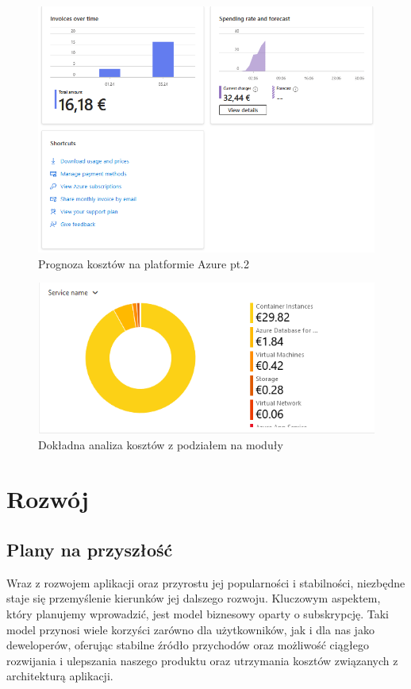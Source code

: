 \begin{figure}[h]
    \centering
    \includegraphics[width=1\textwidth]{Obrazy/costs/costs_2.png}
    \caption{Prognoza kosztów na platformie Azure pt.2}
    \label{fig:my_label}
\end{figure}

\begin{figure}[h]
    \centering
    \includegraphics[width=1\textwidth]{Obrazy/costs/costs_4.png}
    \caption{Dokładna analiza kosztów z podziałem na moduły}
    \label{fig:my_label}
\end{figure}

\clearpage

\section{Rozwój}

\subsection{Plany na przyszłość}
Wraz z rozwojem aplikacji oraz przyrostu jej popularności i stabilności, niezbędne staje się przemyślenie kierunków jej dalszego rozwoju. Kluczowym aspektem, który planujemy wprowadzić, jest model biznesowy oparty o subskrypcję. Taki model przynosi wiele korzyści zarówno dla użytkowników, jak i dla nas jako deweloperów, oferując stabilne źródło przychodów oraz możliwość ciągłego rozwijania i ulepszania naszego produktu oraz utrzymania kosztów związanych z architekturą aplikacji.

